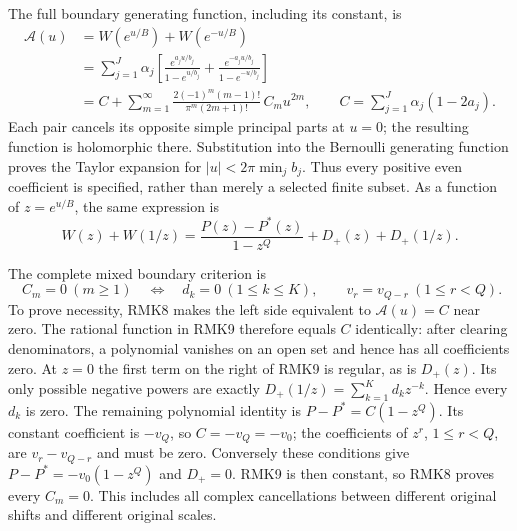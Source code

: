 \documentclass[11pt]{article}
\begin{document}
The full boundary generating function, including its constant, is
\begin{equation}\tag{RMK8}
\begin{split}
 \mathcal A(u)
 &=W(e^{u/B})+W(e^{-u/B})\\
 &=\sum_{j=1}^J\alpha_j\left[
       \frac{e^{a_j u/b_j}}{1-e^{u/b_j}}
       +\frac{e^{-a_j u/b_j}}{1-e^{-u/b_j}}\right]\\
 &=C+\sum_{m=1}^\infty
        \frac{2(-1)^m(m-1)!}{\pi^m(2m+1)!}\,C_m u^{2m},
 \qquad C=\sum_{j=1}^J\alpha_j(1-2a_j).
\end{split}
\end{equation}
Each pair cancels its opposite simple principal parts at $u=0$;
the resulting function is holomorphic there. Substitution into the
Bernoulli generating function proves the Taylor expansion for
$|u|<2\pi\min_j b_j$. Thus every positive even coefficient is
specified, rather than merely a selected finite subset. As a
function of $z=e^{u/B}$, the same expression is
\begin{equation}\tag{RMK9}
 W(z)+W(1/z)
     =\frac{P(z)-P^*(z)}{1-z^Q}+D_+(z)+D_+(1/z).
\end{equation}

The complete mixed boundary criterion is
\begin{equation}\tag{RMK10}
 \boxed{\quad
 C_m=0\ (m\geq1)
 \quad\Longleftrightarrow\quad
 d_k=0\ (1\leq k\leq K),\qquad
 v_r=v_{Q-r}\ (1\leq r<Q).
 \quad}
\end{equation}
To prove necessity, RMK8 makes the left side equivalent to
$\mathcal A(u)=C$ near zero. The rational function in RMK9
therefore equals $C$ identically: after clearing denominators,
a polynomial vanishes on an open set and hence has all coefficients
zero. At $z=0$ the first term on the right of RMK9 is regular,
as is $D_+(z)$. Its only possible negative powers are exactly
$D_+(1/z)=\sum_{k=1}^K d_kz^{-k}$. Hence every $d_k$ is zero.
The remaining polynomial identity is
$P-P^*=C(1-z^Q)$. Its constant coefficient is $-v_Q$, so
$C=-v_Q=-v_0$; the coefficients of $z^r$, $1\leq r<Q$, are
$v_r-v_{Q-r}$ and must be zero. Conversely these conditions give
$P-P^*=-v_0(1-z^Q)$ and $D_+=0$. RMK9 is then constant, so
RMK8 proves every $C_m=0$. This includes all complex cancellations
between different original shifts and different original scales.
\end{document}

